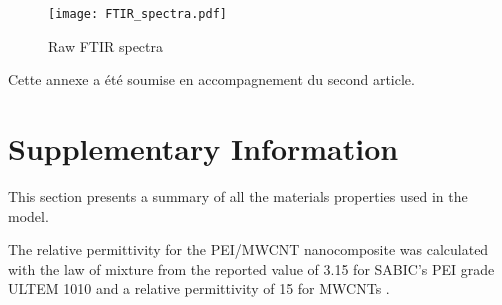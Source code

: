 \begin{figure}[h!]
	\center
	\texttt{[image: FTIR\_spectra.pdf]}
	\caption{Raw FTIR spectra \cite{Brassard2018_figshare_article1}}
	\label{fig:FTIR_spectra}
\end{figure}


Cette annexe a été soumise en accompagnement du second article. 

\section{Supplementary Information}

This section presents a summary of all the materials properties used in the model. 

The relative permittivity for the PEI/MWCNT nanocomposite was calculated with the law of mixture from the reported value of 3.15 for SABIC’s PEI grade ULTEM 1010 and a relative permittivity of 15 for MWCNTs \cite{Katsounaros2011}. 

